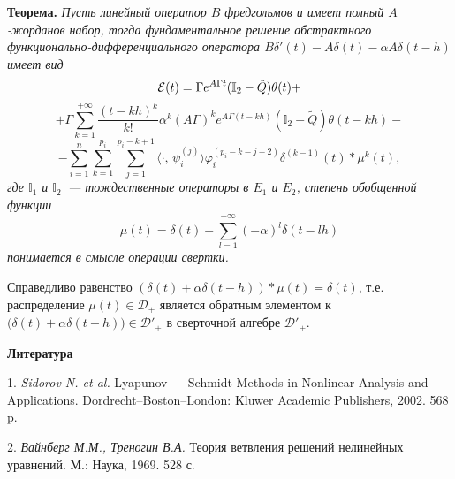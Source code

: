 \textbf{Теорема.} {\it Пусть линейный оператор $B$ фредгольмов и имеет полный $A$-жорданов набор, тогда фундаментальное решение абстрактного функционально-дифференциального оператора $B\delta'(t)-A\delta(t)-\alpha A\delta(t-h)$ имеет вид
$$
{\cal E}(t)=\Gamma e^{A\Gamma t}({\mathbb I}_{2}-\tilde{Q})\theta(t)+
$$
$$
+\Gamma\sum\limits_{k=1}^{+\infty}\frac{(t-kh)^{k}}{k!}\alpha^{k}(A\Gamma)^k e^{A\Gamma (t-kh)}({\mathbb I}_{2}-\tilde{Q})\theta(t-kh)-
$$
$$
 -\sum\limits_{i=1}^{n}\sum\limits_{k=1}^{p_{i}}\sum\limits_{j=1}^{p_{i}-k+1}\langle\cdot,\,\psi^{(j)}_{i}\rangle\varphi^{(p_{i}-k-j+2)}_{i}\delta^{(k-1)}(t)\ast\mu^{k}(t),
$$
где ${\mathbb I}_{1}$ и ${\mathbb I}_{2}$~--- тождественные операторы в $E_{1}$ и $E_{2}$, степень обобщенной функции
$$
\mu(t)=\delta(t)+\sum\limits_{l=1}^{+\infty}(-\alpha)^{l}\delta(t-lh)
$$
понимается в смысле операции свертки.}

Справедливо равенство $(\delta(t)+\alpha\delta(t-h))\ast\mu(t)=\delta(t)$, т.е. распределение $\mu(t)\in{\mathcal D}_{+}$ является обратным элементом к $\bigl(\delta(t)+\alpha\delta(t-h)\bigr)\in{\mathcal D}'_{+}$ в сверточной алгебре ${\mathcal D}'_{+}$.

\smallskip \centerline {\bf Литература} \nopagebreak

1. {\it Sidorov N. et al.} Lyapunov --- Schmidt Methods in Non\-linear Analysis and Applications. Dordrecht--Boston--London: Kluwer Academic Publishers, 2002. 568 p.

2. {\it Вайнберг М.М., Треногин В.А.} Теория ветвления решений нелинейных уравнений. М.: Наука, 1969. 528 с.


